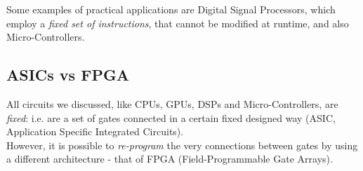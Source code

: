 \documentclass[../template.tex]{subfiles}
\begin{document}
Some examples of practical applications are Digital Signal Processors, which employ a \textit{fixed set of instructions}, that cannot be modified at runtime, and also Micro-Controllers.

\subsection{ASICs vs FPGA}
All circuits we discussed, like CPUs, GPUs, DSPs and Micro-Controllers, are \textit{fixed}: i.e. are a set of gates connected in a certain fixed designed way (ASIC, Application Specific Integrated Circuits).\\
However, it is possible to \textit{re-program} the very connections between gates by using a different architecture - that of FPGA (Field-Programmable Gate Arrays).\\

 
\end{document}
